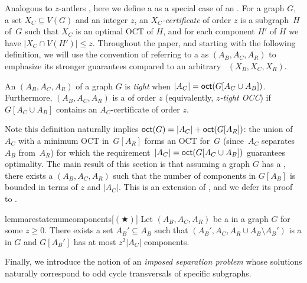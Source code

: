 %
Analogous to $z$-antlers \cite{DonkersJ24}, here we define a \emph{\tocc}
as a special case of an \occ.
%
For a graph $G$, a set $X_C \subseteq V(G)$ and an integer $z$,
an \emph{$X_C$-certificate} of order $z$ is a subgraph~$H$ of~$G$
such that $X_C$ is an optimal OCT of $H$,
and for each component $H'$ of $H$ we have $|X_C \cap V(H')| \leq z$. Throughout the paper, and starting with the following definition, we will use the convention of referring to a \tocc as $(A_B, A_C, A_R)$ to emphasize its stronger guarantees compared to an arbitrary \occ~$(X_B, X_C, X_R)$.

\begin{definition}[($z$-)\tocc] \label{def:zocc}
    An \occ $(A_B,A_C,A_R)$ of a graph $G$ is \emph{tight}
    when $|A_C| = \textnormal{\textsf{oct}}(G[A_C \cup A_B])$.
    Furthermore, $(A_B, A_C, A_R)$ is a \tocc of order $z$ (equivalently, \emph{$z$-tight OCC})
    if $G[A_C \cup A_B]$ contains an $A_C$-certificate of order $z$.
\end{definition}

Note this definition naturally implies $\textnormal{\textsf{oct}}(G) = |A_C| + \textnormal{\textsf{oct}}(G[A_R])$: the union of~$A_C$ with a minimum OCT in~$G[A_R]$ forms an OCT for~$G$ (since~$A_C$ separates~$A_B$ from~$A_R$) for which the requirement~$|A_C| = \textnormal{\textsf{oct}}(G[A_C \cup A_B])$ guarantees optimality. The main result of this section is that assuming a graph $G$ has a \zocc, there exists a \zocc $(A_B,A_C,A_R)$
such that the number of components in $G[A_B]$ is bounded in terms of $z$ and $|A_C|$.
%
This is an extension of \cite[Lemma 4.6]{DonkersJ24}, and we defer its proof to .

\begin{restatable}{lemma}{restatenumcomponents}[$(\bigstar)$]
    \label{lem:num_components}
    Let $(A_B,A_C,A_R)$ be a \zocc in a graph $G$ for some $z \geq 0$.
    There exists a set $A_B' \subseteq A_B$ such that $(A_B',A_C, A_R \cup A_B \setminus A_B')$
    is a \zocc in $G$ and $G[A_B']$ has at most $z^2|A_C|$ components.
\end{restatable}

Finally, we introduce the notion of an \emph{imposed separation problem} whose solutions naturally correspond to odd cycle transversals of
specific subgraphs. 

